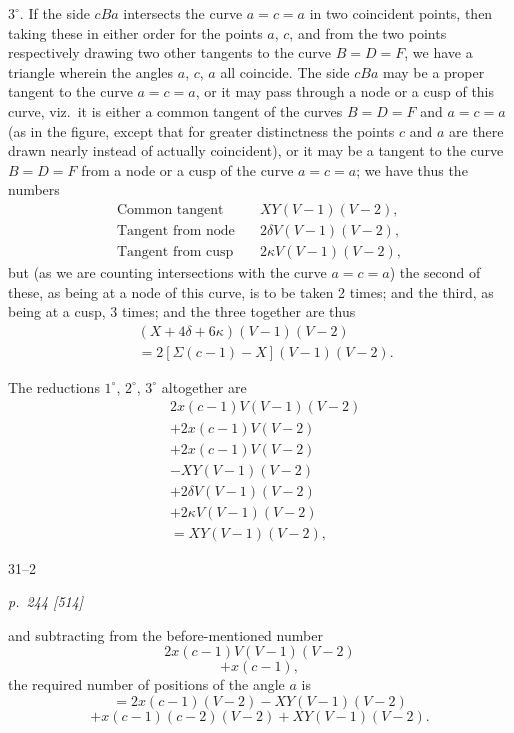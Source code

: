 \documentclass[11pt,a4paper]{article}
\theoremstyle{plain}
\theoremstyle{definition}
\begin{document}
$3^{\circ}$.  If the side $cBa$ intersects the curve $a = c = a$ in two coincident points, then
taking these in either order for the points $a$, $c$, and from the two points respectively
drawing two other tangents to the curve $B = D = F$, we have a triangle wherein the
angles $a$, $c$, $a$ all coincide.  The side $cBa$ may be a proper tangent to the curve
$a = c = a$, or it may pass through a node or a cusp of this curve, viz.\ it is either a
common tangent of the curves $B = D = F$ and $a = c = a$ (as in the figure, except that
for greater distinctness the points $c$ and $a$ are there drawn nearly instead of actually
coincident), or it may be a tangent to the curve $B = D = F$ from a node or a cusp of
the curve $a = c = a$; we have thus the numbers
\begin{align*}
\text{Common tangent} &\quad XY(V - 1)(V - 2), \\
\text{Tangent from node} &\quad 2\delta V(V - 1)(V - 2), \\
\text{Tangent from cusp} &\quad 2\kappa V(V - 1)(V - 2),
\end{align*}
but (as we are counting intersections with the curve $a = c = a$) the second of these,
as being at a node of this curve, is to be taken 2 times; and the third, as being at a
cusp, 3 times; and the three together are thus
\begin{align*}
&(X + 4\delta + 6\kappa)(V - 1)(V - 2) \\
&= 2[\Sigma(c - 1) - X](V - 1)(V - 2).
\end{align*}

The reductions $1^{\circ}$, $2^{\circ}$, $3^{\circ}$ altogether are
\begin{align*}
&2x(c - 1)V(V - 1)(V - 2) \\
&+ 2x(c - 1)V(V - 2) \\
&+ 2x(c - 1)V(V - 2) \\
&- XY(V - 1)(V - 2) \\
&+ 2\delta V(V - 1)(V - 2) \\
&+ 2\kappa V(V - 1)(V - 2) \\
&= XY(V - 1)(V - 2),
\end{align*}

\hfill 31--2

\clearpage

\bigskip
\textit{p.~244 [514]}
\smallskip

\noindent
and subtracting from the before-mentioned number
\[
2x(c - 1)V(V - 1)(V - 2)
\]
\[
+ x(c - 1),
\]
the required number of positions of the angle $a$ is
\[
= 2x(c - 1)(V - 2) - XY(V - 1)(V - 2)
\]
\[
+ x(c - 1)(c - 2)(V - 2) + XY(V - 1)(V - 2).
\]
\end{document}
